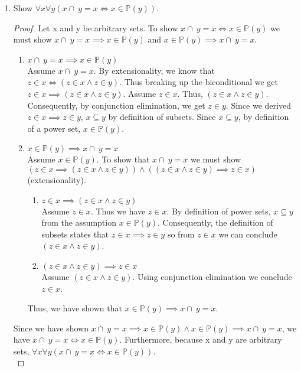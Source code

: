 \documentclass{article}
\newcommand{\intersect}{\cap\:}
\begin{document}
\begin{enumerate}
\begin{enumerate}
    \item Show $\forall x \forall y (x \intersect y = x \iff x \in \mathbb{P}(y))$.
      \begin{proof}
      Let x and y be arbitrary sets. To show $x \intersect y = x \iff x \in \mathbb{P}(y)$ we must show $x \intersect y = x \implies x \in \mathbb{P}(y)$ and $x \in \mathbb{P}(y) \implies x \intersect y = x$.
      \begin{enumerate}
          \item $x \intersect y = x \implies x \in \mathbb{P}(y)$\\
          Assume $x \intersect y = x$. By extensionality, we know that  $z\in x \iff (z\in x \land z \in y)$. Thus breaking up the biconditional we get $z\in x \implies (z\in x \land z \in y)$. Assume $z\in x$. Thus, $(z\in x \land z \in y)$. Consequently, by conjunction elimination, we get $z \in y$. Since we derived $z\in x \implies z \in y$, $x\subseteq y$ by definition of subsets. Since $x \subseteq y$, by definition of a power set, $x \in \mathbb{P}(y)$.
          \item $x \in \mathbb{P}(y) \implies x \intersect y = x$\\
          Assume $x \in \mathbb{P}(y)$. To show that $x \intersect y = x$ we must show $(z\in x \implies (z\in x \land z \in y)) \land ((z\in x \land z \in y)\implies z\in x)$ (extensionality). 
          \begin{enumerate}
              \item $z\in x \implies (z\in x \land z \in y)$\\
              Assume $z \in x$. Thus we have $z \in x$. By definition of power sets, $x \subseteq y$ from the assumption $x \in \mathbb{P}(y)$. Consequently, the definition of subsets states that $z \in x \implies z \in y$ so from $z\in x$ we can conclude $(z\in x \land z \in y)$.
              \item $(z\in x \land z \in y)\implies z\in x$\\
              Assume $(z\in x \land z \in y)$. Using conjunction elimination we conclude $z \in x$. 
          \end{enumerate}
            Thus, we have shown that $x \in \mathbb{P}(y) \implies x \intersect y = x$.
      \end{enumerate}
      Since we have shown $x \intersect y = x \implies x \in \mathbb{P}(y) \land x \in \mathbb{P}(y) \implies x \intersect y = x$, we have $x \intersect y = x \iff x \in \mathbb{P}(y)$. Furthermore, because x and y are arbitrary sets, $\forall x \forall y (x \intersect y = x \iff x \in \mathbb{P}(y))$.\\

\end{proof}
\end{enumerate}
\end{enumerate}
\end{document}
